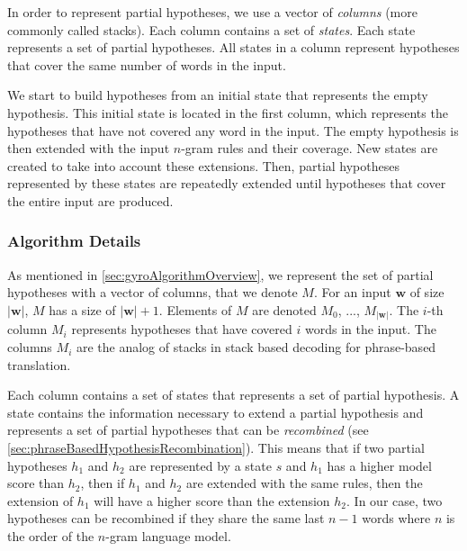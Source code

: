 In order to represent partial hypotheses, we use a vector
of \emph{columns} (more commonly called stacks). Each
column contains a set of
\emph{states}. Each state represents a set of partial hypotheses.
All states in a column represent hypotheses that cover
the same number of words in the input.

We start to build hypotheses from an initial state that
represents the empty hypothesis. This initial state
is located in the first column, which represents the
hypotheses that have not covered any word in the input.
The empty hypothesis is then extended with the input
$n$-gram rules and their coverage. New states are created
to take into account these extensions. Then, partial
hypotheses represented by these states are repeatedly
extended until hypotheses that cover the entire input
are produced.

\subsubsection{Algorithm Details}
\label{sec:gyroAlgoDetails}

As mentioned in \ref{sec:gyroAlgorithmOverview}, we represent
the set of
partial hypotheses with a vector of columns, that we denote
$M$. For an input $\bm{w}$ of size $|\bm{w}|$, $M$ has a size
of $|\bm{w}| + 1$. Elements of $M$ are denoted $M_0$, ..., $M_{|\bm{w}|}$.
The $i$-th column $M_i$ represents hypotheses that have covered
$i$ words in the input. The columns $M_i$ are the analog of stacks
in stack based decoding for phrase-based translation.

Each column contains a set of states that represents a set of partial
hypothesis. A state contains the information necessary to
extend a partial hypothesis and represents a set of
partial hypotheses that can
be \emph{recombined} (see \autoref{sec:phraseBasedHypothesisRecombination}).
This means that if two partial hypotheses $h_1$ and $h_2$
are represented by a state $s$ and $h_1$ has a higher model score than
$h_2$, then if $h_1$ and $h_2$ are extended with the same rules, then
the extension of $h_1$ will have a higher score than the extension $h_2$.
In our case, two hypotheses can be recombined if they share the same last
$n - 1$ words where $n$ is the order of the $n$-gram language model.

